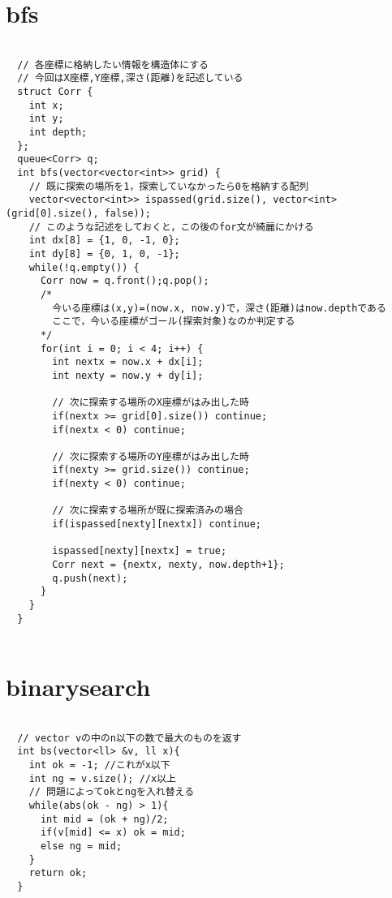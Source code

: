 \documentclass{jsarticle}
\begin{document}
\section{bfs}
\color{black}
\begin{lstlisting}[caption=bfs]

  // 各座標に格納したい情報を構造体にする
  // 今回はX座標,Y座標,深さ(距離)を記述している
  struct Corr {
    int x;
    int y;
    int depth;
  };
  queue<Corr> q;
  int bfs(vector<vector<int>> grid) {
    // 既に探索の場所を1，探索していなかったら0を格納する配列
    vector<vector<int>> ispassed(grid.size(), vector<int>(grid[0].size(), false));
    // このような記述をしておくと，この後のfor文が綺麗にかける
    int dx[8] = {1, 0, -1, 0};
    int dy[8] = {0, 1, 0, -1};
    while(!q.empty()) {
      Corr now = q.front();q.pop();
      /*
        今いる座標は(x,y)=(now.x, now.y)で，深さ(距離)はnow.depthである
        ここで，今いる座標がゴール(探索対象)なのか判定する
      */
      for(int i = 0; i < 4; i++) {
        int nextx = now.x + dx[i];
        int nexty = now.y + dy[i];
  
        // 次に探索する場所のX座標がはみ出した時
        if(nextx >= grid[0].size()) continue;
        if(nextx < 0) continue;
  
        // 次に探索する場所のY座標がはみ出した時
        if(nexty >= grid.size()) continue;
        if(nexty < 0) continue;
  
        // 次に探索する場所が既に探索済みの場合
        if(ispassed[nexty][nextx]) continue;
  
        ispassed[nexty][nextx] = true;
        Corr next = {nextx, nexty, now.depth+1};
        q.push(next);
      }
    }
  }
  

\end{lstlisting}

\color{white}
\section{binarysearch}
\color{black}
\begin{lstlisting}[caption=binarysearch]

  // vector vの中のn以下の数で最大のものを返す
  int bs(vector<ll> &v, ll x){
    int ok = -1; //これがx以下 
    int ng = v.size(); //x以上 
    // 問題によってokとngを入れ替える
    while(abs(ok - ng) > 1){
      int mid = (ok + ng)/2;
      if(v[mid] <= x) ok = mid;
      else ng = mid;
    }
    return ok;
  }
  

\end{lstlisting}
\end{document}
